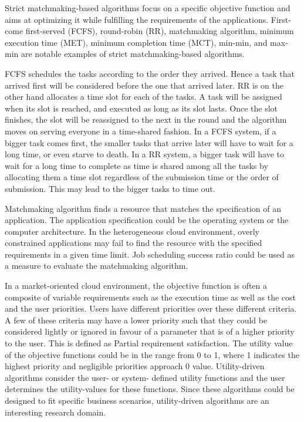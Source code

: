 \documentclass[times, 10pt,twocolumn]{article}
\begin{document}

Strict matchmaking-based algorithms focus on a specific objective function and aims at optimizing it while fulfilling the requirements of the applications. First-come first-served (FCFS), round-robin (RR), matchmaking algorithm, minimum execution time (MET), minimum completion time (MCT), min-min, and max-min\cite{heuristics} are notable examples of strict matchmaking-based algorithms. 

FCFS schedules the tasks according to the order they arrived. Hence a task that arrived first will be considered before the one that arrived later. RR is on the other hand allocates a time slot for each of the tasks. A task will be assigned when its slot is reached, and executed as long as its slot lasts. Once the slot finishes, the slot will be reassigned to the next in the round and the algorithm moves on serving everyone in a time-shared fashion. In a FCFS system, if a bigger task comes first, the smaller tasks that arrive later will have to wait for a long time, or even starve to death. In a RR system, a bigger task will have to wait for a long time to complete as time is shared among all the tasks by allocating them a time slot regardless of the submission time or the order of submission. This may lead to the bigger tasks to time out.

Matchmaking algorithm finds a resource that matches the specification of an application. The application specification could be the operating system or the computer architecture. In the heterogeneous cloud environment, overly constrained applications may fail to find the resource with the specified requirements in a given time limit. Job scheduling success ratio could be used as a measure to evaluate the matchmaking algorithm. 

In a market-oriented cloud environment, the objective function is often a composite of variable requirements such as the execution time as well as the cost and the user priorities. Users have different priorities over these different criteria. A few of these criteria may have a lower priority such that they could be considered lightly or ignored in favour of a parameter that is of a higher priority to the user. This is defined as Partial requirement satisfaction. The utility value of the objective functions could be in the range from 0 to 1, where 1 indicates the highest priority and negligible priorities approach 0 value. Utility-driven algorithms consider the user- or system- defined utility functions and the user determines the utility-values for these functions. Since these algorithms could be designed to fit specific business scenarios, utility-driven algorithms are an interesting research domain.
\end{document}

